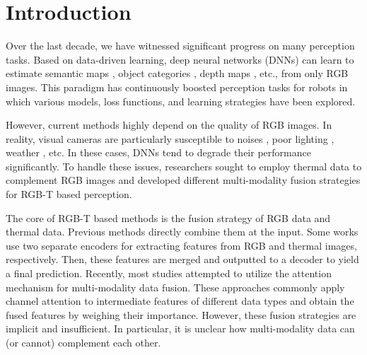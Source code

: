 \documentclass[letterpaper, 10 pt, journal, twoside]{IEEEtran}
\begin{document}
\IEEEpeerreviewmaketitle


\section{Introduction}
Over the last decade, we have witnessed significant progress on many perception tasks. Based on data-driven learning, deep neural networks (DNNs) can learn to estimate semantic maps \cite{FCN,UNet,DeepLab,pspnet,upernet,gcnet}, object categories \cite{FasterRCNN,Yolo,cascadeRCNN,FCOS,TODO}, depth maps \cite{NYU,KITTI,Hu2019RevisitingSI,jiang2021plnet}, etc., from only RGB images. This paradigm has continuously boosted perception tasks for robots in which various models, loss functions, and learning strategies have been explored.


However, current methods highly depend on the quality of RGB images. In reality, visual cameras are particularly susceptible to noises \cite{suganuma2019attention}, poor lighting \cite{hu2021two}, weather \cite{liu2019dual}, etc. In these cases, DNNs tend to degrade their performance significantly. To handle these issues, researchers sought to employ thermal data to complement RGB images and developed different multi-modality fusion strategies for RGB-T based perception.

The core of RGB-T based methods is the fusion strategy of RGB data and thermal data. Previous methods \cite{UCNet,m3fd} directly combine them at the input. Some works \cite{MFNet,RTFNet} use two separate encoders for extracting features from RGB and thermal images, respectively. Then, these features are merged and outputted to a decoder to yield a final prediction.  
 Recently, most studies \cite{ABMDRNet,FEANet} attempted to utilize the attention mechanism for multi-modality data fusion. These approaches commonly apply channel attention to intermediate features of different data types and obtain the fused features by weighing their importance. However, these fusion strategies are implicit and insufficient. In particular, it is unclear how multi-modality data can (or cannot) complement each other.
\end{document}
